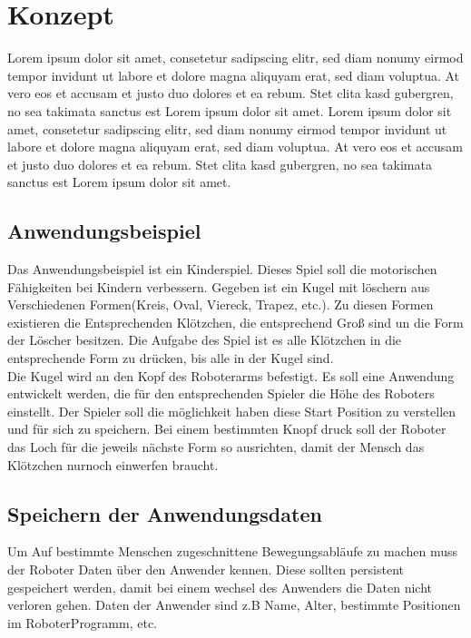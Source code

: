\chapter{Konzept}
\label{konzept_kon}
Lorem ipsum dolor sit amet, consetetur sadipscing elitr, sed diam nonumy eirmod tempor invidunt ut labore et dolore magna aliquyam erat, sed diam voluptua. At vero eos et accusam et justo duo dolores et ea rebum. Stet clita kasd gubergren, no sea takimata sanctus est Lorem ipsum dolor sit amet. Lorem ipsum dolor sit amet, consetetur sadipscing elitr, sed diam nonumy eirmod tempor invidunt ut labore et dolore magna aliquyam erat, sed diam voluptua. At vero eos et accusam et justo duo dolores et ea rebum. Stet clita kasd gubergren, no sea takimata sanctus est Lorem ipsum dolor sit amet.

\section{Anwendungsbeispiel}
\label{sec:anwendung_kon}

Das Anwendungsbeispiel ist ein Kinderspiel. Dieses Spiel soll die motorischen Fähigkeiten bei Kindern verbessern.
Gegeben ist ein Kugel mit löschern aus Verschiedenen Formen(Kreis, Oval, Viereck, Trapez, etc.). Zu diesen Formen existieren die Entsprechenden Klötzchen, die entsprechend Groß sind un die Form der Löscher besitzen. Die Aufgabe des Spiel ist es alle Klötzchen in die entsprechende Form zu drücken, bis alle in der Kugel sind.
\\
Die Kugel wird an den Kopf des Roboterarms befestigt. Es soll eine Anwendung entwickelt werden, die für den entsprechenden Spieler die Höhe des Roboters einstellt. Der Spieler soll die möglichkeit haben diese Start Position zu verstellen und für sich zu speichern. Bei einem bestimmten Knopf druck soll der Roboter das Loch für die jeweils nächste Form so ausrichten, damit der Mensch das Klötzchen nurnoch einwerfen braucht.

\section{Speichern der Anwendungsdaten}
\label{sec:save_of_data_kon}

Um Auf bestimmte Menschen zugeschnittene Bewegungsabläufe zu machen muss der Roboter Daten über den Anwender kennen. Diese sollten persistent gespeichert werden, damit bei einem wechsel des Anwenders die Daten nicht verloren gehen.
Daten der Anwender sind z.B Name, Alter, bestimmte Positionen im RoboterProgramm, etc.

